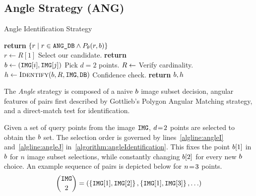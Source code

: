 \subsection{Angle Strategy (ANG)}\label{subsec:angleMethod}
\newcommand{\invalidBijection}{\If{$\solutionmap$ is valid}}
\begin{algorithm}
    \caption{Angle Identification Strategy} \label{algorithm:angleIdentification}
    \begin{algorithmic}[1]
    	\State \textbf{return} $\{ r \mid r \in \texttt{ANG\_DB} \land P_\theta(r, b) \}$
    	\EndFunction
        \\
        \State $r \gets R[1]$ \Comment Select our candidate.
        \State \textbf{return} 
        \EndFunction
        \\
         \label{algline:angleI}
         \label{algline:angleJ}
        \State $b \gets \left(\texttt{IMG}[i], \texttt{IMG}[j]\right)$ \Comment Pick $d=2$ points. 
        \State $R \gets $ 
         \Comment Verify cardinality.
        \State $h \gets \Call{Identify}{b, R, \imageset, \databaseset}$
        \invalidBijection \Comment Confidence check.
        \State \textbf{return} $b, h$
        \EndIf
        \EndIf
        \EndFor
        \EndFor
        \EndProcedure
    \end{algorithmic}
\end{algorithm}

The \textit{Angle} strategy is composed of a naive $b$ image subset decision, angular features of pairs first described by Gottlieb's Polygon Angular Matching strategy, and a direct-match test for identification.

Given a set of query points from the image $\texttt{IMG}$, $d \!=\! 2$ points are selected to obtain the $b$ set.
The selection order is governed by lines~\ref{algline:angleI} and~\ref{algline:angleJ} in~\autoref{algorithm:angleIdentification}.
This fixes the point $b[1]$ in $b$ for $n$ image subset selections, while constantly changing $b[2]$ for every new $b$ choice.
An example sequence of pairs is depicted below for $n \!=\! 3$ points.
\begin{equation}
    \binom{\texttt{IMG}}{2} = \left(\left\{ \texttt{IMG}[1], \texttt{IMG}[2] \right\}, \left\{ \texttt{IMG}[1],\texttt{IMG}[3] \right\}, \ldots \right)
\end{equation}

